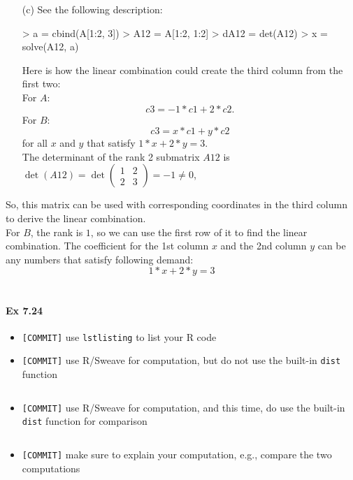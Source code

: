 \documentclass[12pt]{article}
\begin{document}
\begin{itemize}
\item[(c)] See the following description:\\
\begin{Schunk}
\begin{Sinput}
> a = cbind(A[1:2, 3])
> A12 = A[1:2, 1:2]
> dA12 = det(A12)
> x = solve(A12, a)
\end{Sinput}
\end{Schunk}
Here is how the linear combination could create the third column from the first two:\\
For $A$:\\
$$c3=-1*c1+2*c2.$$
For $B$:\\
$$c3=x*c1+y*c2$$ for all $x$ and $y$ that satisfy $1*x+2*y=3$.\\

The determinant of the rank 2 submatrix $A12$ is $\det(A12)=\det
\begin{pmatrix}
1&2\\
2&3
\end{pmatrix}
=-1 \neq 0$,

\end{itemize}

So, this matrix can be used with corresponding coordinates in the third column to derive the linear combination.\\

For $B$, the rank is $1$, so we can use the first row of it to find the linear combination. The coefficient for the 1st column $x$ and the 2nd column $y$ can be any numbers that satisfy following demand:$$1*x+2*y=3$$\\


\paragraph{Ex 7.24}
\begin{itemize}
    \item \verb+[COMMIT]+ use \verb+lstlisting+ to list your R code
    \item \verb+[COMMIT]+ use R/Sweave for computation, but do not use the built-in \verb+dist+
        function
\begin{lstlisting}
\end{lstlisting}
    \item \verb+[COMMIT]+ use R/Sweave for computation, and this time, do use the built-in \verb+dist+
        function for comparison
\begin{lstlisting}
\end{lstlisting}
    \item \verb+[COMMIT]+ make sure to explain your computation, e.g., compare the two
        computations
\end{itemize}
\end{document}
